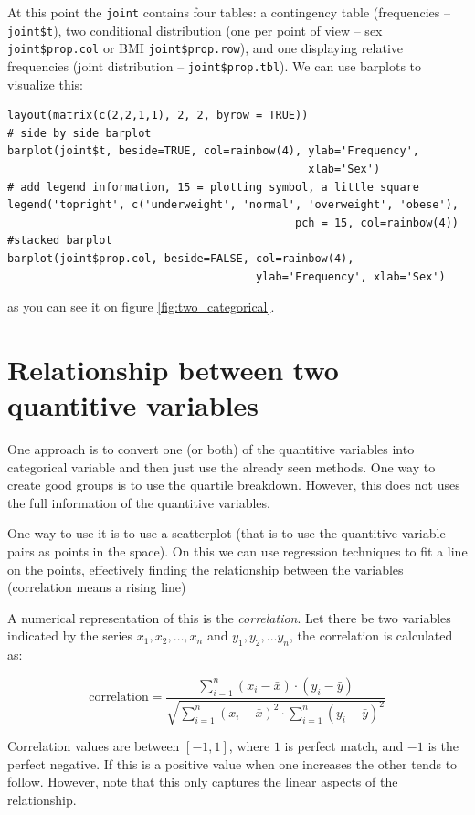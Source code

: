 At this point the \texttt{joint} contains four tables: a contingency table
(frequencies -- \texttt{joint\$t}), two conditional distribution (one per point
of view -- sex \texttt{joint\$prop.col} or BMI \texttt{joint\$prop.row}), and
one displaying relative frequencies (joint distribution --
\texttt{joint\$prop.tbl}). We can use barplots to visualize this:

\begin{verbatim}
layout(matrix(c(2,2,1,1), 2, 2, byrow = TRUE))
# side by side barplot
barplot(joint$t, beside=TRUE, col=rainbow(4), ylab='Frequency',
                                              xlab='Sex')
# add legend information, 15 = plotting symbol, a little square
legend('topright', c('underweight', 'normal', 'overweight', 'obese'),
                                            pch = 15, col=rainbow(4))
#stacked barplot
barplot(joint$prop.col, beside=FALSE, col=rainbow(4),
                                      ylab='Frequency', xlab='Sex')
\end{verbatim}

as you can see it on figure \ref{fig:two_categorical}.

\section{Relationship between two quantitive variables}

One approach is to convert one (or both) of the quantitive variables into
categorical variable and then just use the already seen methods. One way to
create good groups is to use the quartile breakdown. However, this does not uses
the full information of the quantitive variables.

One way to use it is to use a scatterplot (that is to use the quantitive
variable pairs as points in the space). On this we can use regression techniques
to fit a line on the points, effectively finding the relationship between the
variables (correlation means a rising line)

A numerical representation of this is the \emph{correlation}. Let there be two
variables indicated by the series $x_1, x_2, \ldots, x_n$ and $y_1, y_2, \ldots
	y_n$, the correlation is calculated as:

\[ \mbox{correlation} = \frac{\sum_{i=1}^{n}\left( x_i-\bar{x}\right) \cdot
		\left( y_i - \bar{y}\right)}{\sqrt{\sum_{i=1}^{n}\left( x_i-\bar{x}\right)^2
			\cdot \sum_{i=1}^{n}\left( y_i - \bar{y}\right)^2}}
\]

Correlation values are between $[-1, 1]$, where $1$ is perfect match, and $-1$
is the perfect negative. If this is a positive value when one increases the
other tends to follow. However, note that this only captures the linear aspects
of the relationship.

